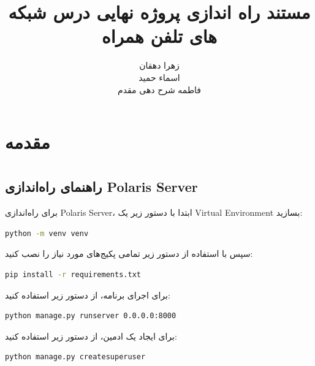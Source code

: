 \documentclass{report}
\title{مستند راه اندازی پروژه نهایی درس شبکه های تلفن همراه}
\author{زهرا دهقان\\اسماء حمید\\فاطمه شرح دهی مقدم}
\begin{document}
\Godpage
\maketitle
{}
\tableofcontents


\chapter{مقدمه}








\chapter{ }
\section{راهنمای راه‌اندازی Polaris Server}

برای راه‌اندازی Polaris Server، ابتدا با دستور زیر یک Virtual Environment بسازید:

\begin{lstlisting}[language=bash]
python -m venv venv
\end{lstlisting}

سپس با استفاده از دستور زیر تمامی پکیج‌های مورد نیاز را نصب کنید:

\begin{lstlisting}[language=bash]
pip install -r requirements.txt
\end{lstlisting}

برای اجرای برنامه، از دستور زیر استفاده کنید:

\begin{lstlisting}[language=bash]
python manage.py runserver 0.0.0.0:8000
\end{lstlisting}

برای ایجاد یک ادمین، از دستور زیر استفاده کنید:

\begin{lstlisting}[language=bash]
python manage.py createsuperuser
\end{lstlisting}


\chapter{ }

\chapter{ }
\end{document}
